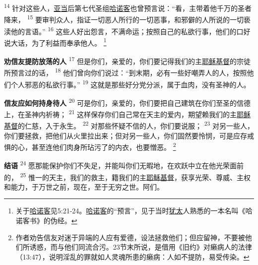 \textsuperscript{14}
针对这些人，\uline{亚当}后第七代圣组\uline{哈诺客}也曾预言说：“看，主带着他千万的圣者降来，
\textsuperscript{15}
要审判众人，指证一切恶人所行的一切恶事，和邪僻的人所说的一切亵渎他的言语。”
\textsuperscript{16}
这些人好出怨言，不满命运；按照自己的私欲行事，他们的口好说大话，为了利益而奉承他人。
\footnote{关于\uline{哈诺客}见5:21-24。\uline{哈诺客}的“预言”，见于当时\uline{犹太}人熟悉的一本名叫《哈诺客书》的伪经。}

\textbf{劝信友提防放荡的人\quad}
\textsuperscript{17}
但是你们，亲爱的，你们要记得我们的主\uline{耶稣}\uline{基督}的宗徒所预言过的话，
\textsuperscript{18}
他们曾向你们说过：“到末期，必有一些好嘲弄人的人，按照他们个人邪恶的私欲行事。”
\textsuperscript{19}
这就是那些好分党分派，属于血肉，没有圣神的人。

\textbf{信友应如何持身待人\quad}
\textsuperscript{20}
可是你们，亲爱的，你们要把自己建筑在你们至圣的信德上，在圣神内祈祷；
\textsuperscript{21}
这样保存你们自己常在天主的爱内，期望赖我们的主\uline{耶稣}\uline{基督}的仁慈，入于永生。
\textsuperscript{22}
对那些怀疑不信的人，你们要说服；
\textsuperscript{23}
对另一些人，你们要拯救，把他们从火里拉出来；但对另一些人，你们固然要怜悯，可是应存戒惧的心，甚至连他们肉身所玷污了的内衣，也要憎恶。
\footnote{作者劝告信友对迷于异端的人应有爱德，设法拯救他们；但应留神，不要被他们所诱惑，而与他们同流合污。23节末所说，是借用《旧约》对癞病人的法律（13:47），说明淫乱的罪就如人灵魂所患的癞病：人如不提防，易受传染。}

\textbf{结语\quad}
\textsuperscript{24}
愿那能保护你们不失足，并能叫你们无暇地，在欢跃中立在他光荣面前的，
\textsuperscript{25}
惟一的天主，我们的救主，籍我们的主\uline{耶稣}\uline{基督}，获享光荣、尊威、主权和能力，于万世之前，现在，至于无穷之世。阿们。
